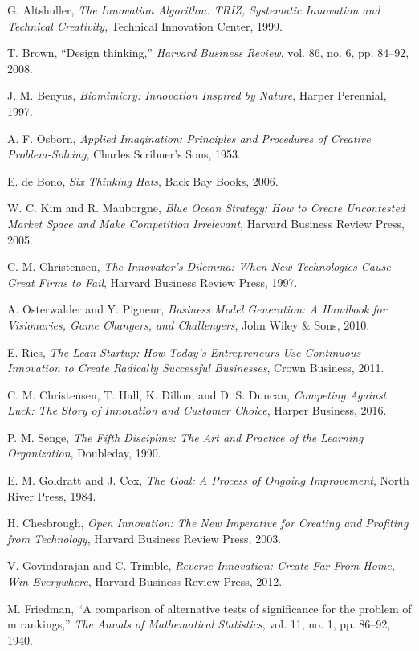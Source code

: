 \documentclass[12pt]{article}
\begin{document}
\begin{thebibliography}{15}

G. Altshuller, \textit{The Innovation Algorithm: TRIZ, Systematic Innovation and Technical Creativity}, Technical Innovation Center, 1999.

T. Brown, ``Design thinking,'' \textit{Harvard Business Review}, vol. 86, no. 6, pp. 84--92, 2008.

J. M. Benyus, \textit{Biomimicry: Innovation Inspired by Nature}, Harper Perennial, 1997.

A. F. Osborn, \textit{Applied Imagination: Principles and Procedures of Creative Problem-Solving}, Charles Scribner's Sons, 1953.

E. de Bono, \textit{Six Thinking Hats}, Back Bay Books, 2006.

W. C. Kim and R. Mauborgne, \textit{Blue Ocean Strategy: How to Create Uncontested Market Space and Make Competition Irrelevant}, Harvard Business Review Press, 2005.

C. M. Christensen, \textit{The Innovator's Dilemma: When New Technologies Cause Great Firms to Fail}, Harvard Business Review Press, 1997.

A. Osterwalder and Y. Pigneur, \textit{Business Model Generation: A Handbook for Visionaries, Game Changers, and Challengers}, John Wiley \& Sons, 2010.

E. Ries, \textit{The Lean Startup: How Today's Entrepreneurs Use Continuous Innovation to Create Radically Successful Businesses}, Crown Business, 2011.

C. M. Christensen, T. Hall, K. Dillon, and D. S. Duncan, \textit{Competing Against Luck: The Story of Innovation and Customer Choice}, Harper Business, 2016.

P. M. Senge, \textit{The Fifth Discipline: The Art and Practice of the Learning Organization}, Doubleday, 1990.

E. M. Goldratt and J. Cox, \textit{The Goal: A Process of Ongoing Improvement}, North River Press, 1984.

H. Chesbrough, \textit{Open Innovation: The New Imperative for Creating and Profiting from Technology}, Harvard Business Review Press, 2003.

V. Govindarajan and C. Trimble, \textit{Reverse Innovation: Create Far From Home, Win Everywhere}, Harvard Business Review Press, 2012.

M. Friedman, ``A comparison of alternative tests of significance for the problem of m rankings,'' \textit{The Annals of Mathematical Statistics}, vol. 11, no. 1, pp. 86--92, 1940.

\end{thebibliography}
\end{document}
